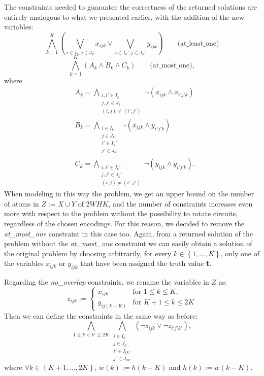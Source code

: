 \documentclass[]{article}
\begin{document}
The constraints needed to guarantee the correctness of the returned solutions are entirely analogous to what we presented earlier, with the addition of the new variables:
\begin{equation*}
	\bigwedge_{k=1}^{K} \left(\bigvee_{i\in I_k, j\in J_k} x_{ijk} \lor \bigvee_{i\in I_k', j \in J_k'} y_{ijk}\right) \qquad \text{(at\_least\_one)}
\end{equation*}
\begin{equation*}
	\bigwedge_{k=1}^K \left(A_k \wedge B_k \wedge C_k\right) \qquad \text{(at\_most\_one)},
\end{equation*}
where \begin{align*} & A_k = \bigwedge_{\substack{i,i'\in I_k \\ j,j'\in J_k \\ (i,j) \neq (i',j')}} \neg(x_{ijk}\wedge x_{i'j'k}) \\ & B_k = \bigwedge_{\substack{i\in I_k \\ j\in J_k \\ i'\in I_k' \\ j' \in J_k'}} \neg(x_{ijk}\wedge y_{i'j'k}) \\ & C_k = \bigwedge_{\substack{i,i'\in I_k' \\ j,j'\in J_k' \\ (i,j) \neq (i',j')}} \neg(y_{ijk}\wedge y_{i'j'k}).
\end{align*}
When modeling in this way the problem, we get an upper bound on the number of atoms in $Z:=X\cup Y$ of $2WHK$, and the number of constraints increases even more with respect to the problem without the possibility to rotate circuits, regardless of the chosen encodings. For this reason, we decided to remove the \emph{at\_most\_one} constraint in this case too. Again, from a returned solution of the problem without the \emph{at\_most\_one} constraint we can easily obtain a solution of the original problem by choosing arbitrarily, for every $k \in \left\{1,\dots,K\right\}$, only one of the variables $x_{ijk}$ or $y_{ijk}$ that have been assigned the truth value \textbf{t}.

Regarding the \emph{no\_overlap} constraints, we rename the variables in $Z$ as:
\begin{equation*}
	z_{ijk}:= \begin{cases}
		x_{ijk} & \text{for $1\leq k\leq K$,}\\
		y_{ij(k-K)} & \text{for $K+1\leq k \leq 2K $}
	\end{cases}
\end{equation*}
Then we can define the constraints in the same way as before: 
\begin{equation*}
	\bigwedge_{1\leq k<k'\leq 2K} \bigwedge_{\substack{i \in I_k \\ j \in J_k \\ i'\in I_{kk'} \\ j' \in J_{kk'}}} \left(\neg z_{ijk} \lor \neg z_{i'j'k'}\right),
\end{equation*}
where $\forall k\in \left\{K+1,\dots,2K\right\}$, $w(k):=h(k-K)$ and $h(k):=w(k-K)$.
\end{document}
